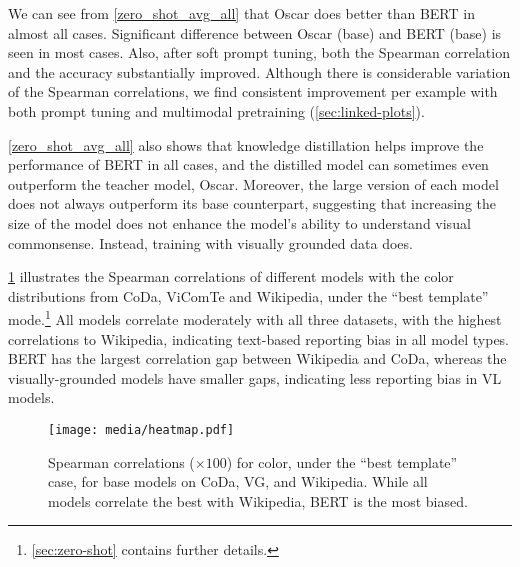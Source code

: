 \documentclass[11pt]{article}
\newcommand{\dataset}{ViComTe}
\begin{document}
We can see from \cref{zero_shot_avg_all} that Oscar does better than BERT in almost all cases. Significant difference between Oscar (base) and BERT (base) is seen in most cases.
Also, after soft prompt tuning, both the Spearman correlation and the accuracy substantially improved. 
Although there is considerable variation of the Spearman correlations, we find consistent improvement per example with both prompt tuning and multimodal pretraining (\cref{sec:linked-plots}).


\cref{zero_shot_avg_all} also shows that knowledge distillation helps improve the performance of BERT in all cases, and the distilled model can sometimes even outperform the teacher model, Oscar.
Moreover, the large version of each model does not always outperform its base counterpart, suggesting that increasing the size of the model does not enhance the model's ability to understand visual commonsense. Instead, training with visually grounded data does.

\cref{fig:heatmap} illustrates the Spearman correlations of different models with the color distributions from CoDa, {\dataset} and Wikipedia, under the ``best template'' mode.\footnote{\cref{sec:zero-shot} contains further details.} All models correlate moderately with all three datasets, with the highest correlations to Wikipedia, indicating text-based reporting bias in all model types. 
BERT has the largest correlation gap between Wikipedia and CoDa, whereas the visually-grounded models have smaller gaps, indicating less reporting bias in VL models.

\begin{figure}[t]
    \centering
    \texttt{[image: media/heatmap.pdf]}
    \caption{Spearman correlations ($\times 100$) for color, under the ``best template'' case, for base models on CoDa, VG, and Wikipedia. While all models correlate the best with Wikipedia, BERT is the most biased.}
    \label{fig:heatmap}
\vspace{-0.9em}
\end{figure}
\end{document}
